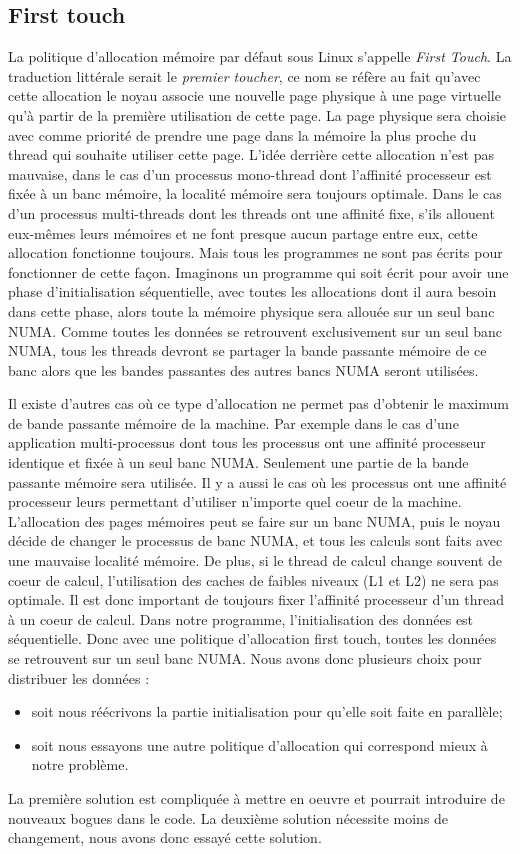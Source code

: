 \subsection{First touch}
La politique d'allocation mémoire par défaut sous Linux s'appelle {\em First Touch}.
%
La traduction littérale serait le {\em premier toucher}, ce nom se réfère au fait qu'avec cette allocation le noyau associe une nouvelle page physique à une page virtuelle qu'à partir de la première utilisation de cette page.
%
La page physique sera choisie avec comme priorité de prendre une page dans la mémoire la plus proche du thread qui souhaite utiliser cette page.
%
L'idée derrière cette allocation n'est pas mauvaise, dans le cas d'un processus mono-thread dont l'affinité processeur est fixée à un banc mémoire, la localité mémoire sera toujours optimale.
%
Dans le cas d'un processus multi-threads dont les threads ont une affinité fixe, s'ils allouent eux-mêmes leurs mémoires et ne font presque aucun partage entre eux, cette allocation fonctionne toujours.
%
Mais tous les programmes ne sont pas écrits pour fonctionner de cette façon.
%
Imaginons un programme qui soit écrit pour avoir une phase d'initialisation séquentielle, avec toutes les allocations dont il aura besoin dans cette phase, alors toute la mémoire physique sera allouée sur un seul banc NUMA.
%
Comme toutes les données se retrouvent exclusivement sur un seul banc NUMA, tous les threads devront se partager la bande passante mémoire de ce banc alors que les bandes passantes des autres bancs NUMA seront utilisées.


Il existe d'autres cas où ce type d'allocation ne permet pas d'obtenir le maximum de bande passante mémoire de la machine.
%
Par exemple dans le cas d'une application multi-processus dont tous les processus ont une affinité processeur identique et fixée à un seul banc NUMA.
%
Seulement une partie de la bande passante mémoire sera utilisée.
%
Il y a aussi le cas où les processus ont une affinité processeur leurs permettant d'utiliser n'importe quel coeur de la machine.
%
L'allocation des pages mémoires peut se faire sur un banc NUMA, puis le noyau décide de changer le processus de banc NUMA, et tous les calculs sont faits avec une mauvaise localité mémoire.
%
De plus, si le thread de calcul change souvent de coeur de calcul, l'utilisation des caches de faibles niveaux (L1 et L2) ne sera pas optimale.
%
Il est donc important de toujours fixer l'affinité processeur d'un thread à un coeur de calcul.
%
Dans notre programme, l'initialisation des données est séquentielle. Donc avec une politique d'allocation first touch, toutes les données se retrouvent sur un seul banc NUMA.
%
Nous avons donc plusieurs choix pour distribuer les données :
\begin{itemize}
  \item soit nous réécrivons la partie initialisation pour qu'elle soit faite en parallèle;
  \item soit nous essayons une autre politique d'allocation qui correspond mieux à notre problème.
\end{itemize}
%
La première solution est compliquée à mettre en oeuvre et pourrait introduire de nouveaux bogues dans le code.
%
La deuxième solution nécessite moins de changement, nous avons donc essayé cette solution.
